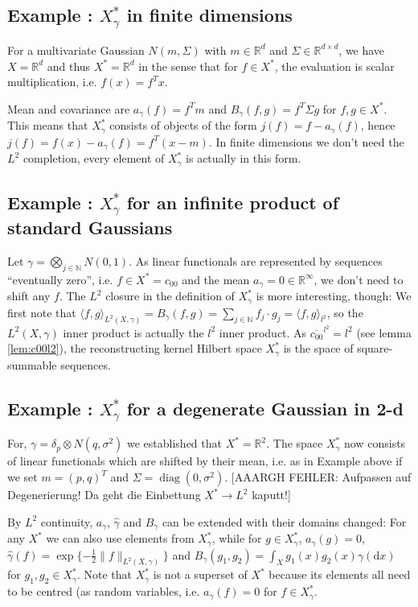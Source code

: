 \documentclass{scrartcl}
\theoremstyle{definition}
\theoremstyle{remark}
\newcommand{\de}{\mathrm d}
\newcommand{\N}{\mathbb N}
\newcommand{\R}{\mathbb R}
\newcommand{\ednote}[1]{{\color{red}[#1]}}
\newcommand*\circled[1]{\tikz[baseline=(char.base)]{
            \node[shape=circle,draw,inner sep=2pt] (char) {#1};}}
\DeclareRobustCommand{\myboxtwo}[2][blue!20]{%
\begin{tcolorbox}[   %
        breakable,
        left=0pt,
        right=0pt,
        top=0pt,
        bottom=0pt,
        colback=#1,
        colframe=#1,
        width=\dimexpr\textwidth\relax, 
        enlarge left by=0mm,
        boxsep=5pt,
        arc=10pt,outer arc=10pt,
        ]
        #2
\end{tcolorbox}
}
\begin{document}
\myboxtwo{
\subsection*{Example \circled{1}: $X_\gamma^*$ in finite dimensions}
For a multivariate Gaussian $N(m,\Sigma)$ with $m\in \R^d$ and $\Sigma\in \R^{d\times d}$, we have $X = \R^d$ and thus $X^* = \R^d$ in the sense that for $f\in X^*$, the evaluation is scalar multiplication, i.e. $f(x) = f^T x$.

Mean and covariance are $a_\gamma(f) = f^Tm$ and $B_\gamma(f, g) = f^T\Sigma g$ for $f,g\in X^*$. This means that $X_\gamma^*$ consists of objects of the form $j(f) = f - a_\gamma(f)$, hence $j(f) = f(x) - a_\gamma(f) = f^T(x-m)$. In finite dimensions we don't need the $L^2$ completion, every element of $X_\gamma^*$ is actually in this form. 
}

\myboxtwo{
\subsection*{Example \circled{2}: $X_\gamma^*$ for an infinite product of standard Gaussians}
Let $\gamma =  \bigotimes_{j\in\N} N(0,1)$. As linear functionals are represented by sequences ``eventually zero'', i.e. $f\in X^* = c_{00}$ and the mean $a_\gamma = 0\in\R^\infty$, we don't need to shift any $f$. The $L^2$ closure in the definition of $X_\gamma^*$ is more interesting, though: We first note that $\langle f,g\rangle_{L^2(X, \gamma)} = B_\gamma(f, g) = \sum_{j\in\N}f_j\cdot g_j = \langle f,g\rangle_{l^2}$, so the $L^2(X,\gamma)$ inner product is actually the $l^2$ inner product. As $\overline{c_{00}}^{l^2} = l^2$ (see lemma \ref{lem:c00l2}), the reconstructing kernel Hilbert space $X_\gamma^*$ is the space of square-summable sequences.
}
\myboxtwo{
\subsection*{Example \circled{3}: $X_\gamma^*$ for a degenerate Gaussian in 2-d}
For, $\gamma = \delta_p \otimes N(q, \sigma^2)$ we established that $X^* = \R^2$. The space $X_\gamma^*$ now consists of linear functionals which are shifted by their mean, i.e. as in Example \circled{1} above if we set $m = (p,q)^T$ and $\Sigma = \operatorname{diag}(0,\sigma^2)$. \ednote{AAARGH FEHLER: Aufpassen auf Degenerierung! Da geht die Einbettung $X^*\to L^2$ kaputt!}
}
By $L^2$ continuity, $a_\gamma$, $\hat \gamma$ and $B_\gamma$ can be extended with their domains changed: For any $X^*$ we can also use elements from $X_\gamma^*$, while for $g\in X_\gamma^*$, $a_\gamma(g) = 0$, $\hat \gamma(f) = \exp\{-\frac{1}{2}\|f\|_{L^2(X,\gamma)}\}$ and $B_\gamma(g_1, g_2) = \int_X g_1(x)g_2(x)\gamma(\de x)$ for $g_1,g_2\in X_\gamma^*$. Note that $X_\gamma^*$ is not a superset of $X^*$ because its elements all need to be centred (as random variables, i.e. $a_\gamma(f) = 0$ for $f\in X_\gamma^*$.
\end{document}
